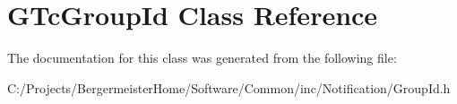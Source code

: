 \hypertarget{class_g_tc_group_id}{}\section{G\+Tc\+Group\+Id Class Reference}
\label{class_g_tc_group_id}


The documentation for this class was generated from the following file\+:\begin{DoxyCompactItemize}
\item 
C\+:/\+Projects/\+Bergermeister\+Home/\+Software/\+Common/inc/\+Notification/Group\+Id.\+h\end{DoxyCompactItemize}
